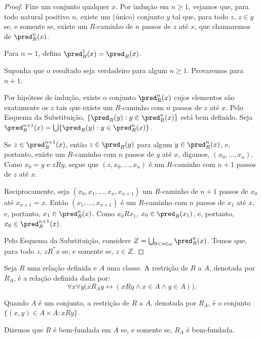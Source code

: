\begin{proof}
    Fixe um conjunto qualquer $x$.
    Por indução em $n\geq 1$, vejamos que, para todo natural positivo $n$, existe um (único) conjunto $y$ tal que, para todo $z$, $z\in y$ se, e somente se, existe um $R$-caminho de $n$ passos de $z$ até $x$, que chamaremos de $\pred^n_{R}(x)$.

    Para $n=1$, defina $\pred^1_R(x)=\pred_R(x)$.

    Suponha que o resultado seja verdadeiro para algum $n\geq 1$.
    Provaremos para $n+1$.

    Por hipótese de indução, existe o conjunto $\pred^n_{R}(x)$ cujos elementos são exatamente os $z$ tais que existe um $R$-caminho com $n$ passos de $z$ até $x$.
    Pelo Esquema da Substituição, $\{\pred_R(y): y\in \pred^n_R(x)\}$ está bem definido.
    Seja $\pred^{n+1}_{R}(x)=\bigcup\{\pred_{R}(y): y\in \pred^n_{R}(x)\}$.

    Se $z\in \pred^{n+1}_{R}(x)$, então $z\in \pred_{R}(y)$ para algum $y\in \pred^n_{R}(x)$, e, portanto, existe um $R$-caminho com $n$ passos de $y$ até $x$, digamos, $(x_0, \dots, x_{n})$.
    Como $x_0=y$ e $z R y$, segue que $(z, x_0, \dots, x_{n})$ é um $R$-caminho com $n+1$ passos de $z$ até $x$.

    Reciprocamente, seja $(x_0, x_1, \dots, x_n, x_{n+1})$ um $R$-caminho de $n+1$ passos de $x_0$ até $x_{n+1}=x$.
    Então $(x_1, \dots, x_{n+1})$ é um $R$-caminho com $n$ passos de $x_1$ até $x$, e, portanto, $x_1\in \pred^n_{R}(x)$.
    Como $x_0 R x_1$, $x_0\in \pred_{R}(x_1)$, e, portanto, $x_0\in \pred^{n+1}_{R}(x)$.

    Pelo Esquema da Substituição, considere $Z=\bigcup_{0<n\in \omega} \pred^n_{R}(x)$.
    Temos que, para todo $z$, $z R^* x$ se, e somente se, $z\in Z$.
\end{proof}


\begin{definition}[$\BST$]
    Seja $R$ uma relação definida e $A$ uma classe.
    A restrição de $R$ a $A$, denotada por $R_A$, é a relação definida dada por:
    \[
        \forall x \forall y\bigg(x R_A y \leftrightarrow (x R y \land x\in A \land y\in A)\bigg).
    \]

    Quando $A$ é um conjunto, a restrição de $R$ a $A$, denotada por $R_A$, é o conjunto $\{(x,y)\in A\times A: x R y\}$.

    Dizemos que $R$ é bem-fundada em $A$ se, e somente se, $R_A$ é bem-fundada.
\end{definition}

